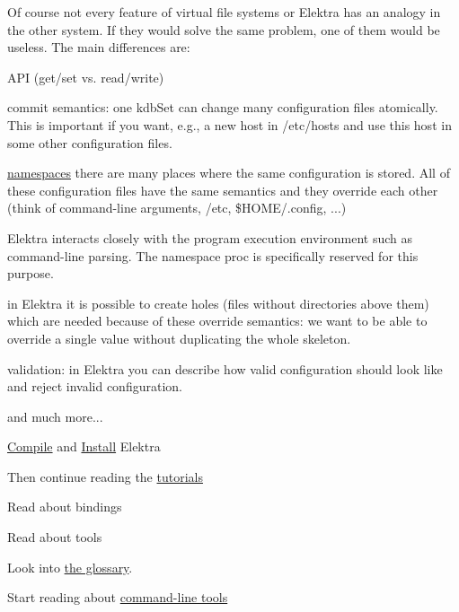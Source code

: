 Of course not every feature of virtual file systems or Elektra has an analogy in the other system. If they would solve the same problem, one of them would be useless. The main differences are\+:


\begin{DoxyItemize}
\item A\+PI (get/set vs. read/write)
\item commit semantics\+: one {\ttfamily kdb\+Set} can change many configuration files atomically. This is important if you want, e.\+g., a new host in {\ttfamily /etc/hosts} and use this host in some other configuration files.
\item \hyperlink{doc_help_elektra-namespaces_md}{namespaces} there are many places where the same configuration is stored. All of these configuration files have the same semantics and they override each other (think of command-\/line arguments, {\ttfamily /etc}, {\ttfamily \$\+H\+O\+ME/.config}, ...)
\item Elektra interacts closely with the program execution environment such as command-\/line parsing. The namespace {\ttfamily proc} is specifically reserved for this purpose.
\item in Elektra it is possible to create holes (files without directories above them) which are needed because of these override semantics\+: we want to be able to override a single value without duplicating the whole skeleton.
\item validation\+: in Elektra you can describe how valid configuration should look like and reject invalid configuration.
\item and much more...
\end{DoxyItemize}


\begin{DoxyItemize}
\item \hyperlink{doc_COMPILE_md}{Compile} and \hyperlink{doc_INSTALL_md}{Install} Elektra
\item Then continue reading the \hyperlink{md_doc_tutorials_README_doc_tutorials_README_md}{tutorials}
\item Read about bindings
\item Read about tools
\item Look into \hyperlink{doc_help_elektra-glossary_md}{the glossary}.
\item Start reading about \hyperlink{doc_help_kdb_md}{command-\/line tools} 
\end{DoxyItemize}